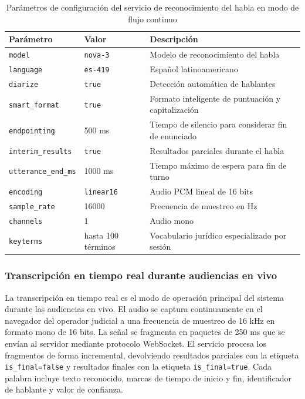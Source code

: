 \documentclass[12pt,a4paper,oneside]{article}
\begin{document}
\begin{table}[H]
\centering
\caption{Par\'ametros de configuraci\'on del servicio de reconocimiento del habla en modo de flujo continuo}
\begin{tabular}{|p{3.5cm}|p{3.5cm}|p{5.5cm}|}
\hline
\rowcolor{gray!20}
\textbf{Par\'ametro} & \textbf{Valor} & \textbf{Descripci\'on} \\
\hline
\texttt{model} & \texttt{nova-3} & Modelo de reconocimiento del habla \\
\hline
\texttt{language} & \texttt{es-419} & Espa\~nol latinoamericano \\
\hline
\texttt{diarize} & \texttt{true} & Detecci\'on autom\'atica de hablantes \\
\hline
\texttt{smart\_format} & \texttt{true} & Formato inteligente de puntuaci\'on y capitalizaci\'on \\
\hline
\texttt{endpointing} & 500 ms & Tiempo de silencio para considerar fin de enunciado \\
\hline
\texttt{interim\_results} & \texttt{true} & Resultados parciales durante el habla \\
\hline
\texttt{utterance\_end\_ms} & 1000 ms & Tiempo m\'aximo de espera para fin de turno \\
\hline
\texttt{encoding} & \texttt{linear16} & Audio PCM lineal de 16 bits \\
\hline
\texttt{sample\_rate} & 16000 & Frecuencia de muestreo en Hz \\
\hline
\texttt{channels} & 1 & Audio mono \\
\hline
\texttt{keyterms} & hasta 100 t\'erminos & Vocabulario jur\'idico especializado por sesi\'on \\
\hline
\end{tabular}
\label{tab:deepgram_streaming}
\end{table}

\subsubsection{Transcripci\'on en tiempo real durante audiencias en vivo}

La transcripci\'on en tiempo real es el modo de operaci\'on principal del sistema durante las audiencias en vivo. El audio se captura continuamente en el navegador del operador judicial a una frecuencia de muestreo de 16 kHz en formato mono de 16 bits. La se\~nal se fragmenta en paquetes de 250 ms que se env\'ian al servidor mediante protocolo WebSocket. El servicio procesa los fragmentos de forma incremental, devolviendo resultados parciales con la etiqueta \texttt{is\_final=false} y resultados finales con la etiqueta \texttt{is\_final=true}. Cada palabra incluye texto reconocido, marcas de tiempo de inicio y fin, identificador de hablante y valor de confianza.
\end{document}
